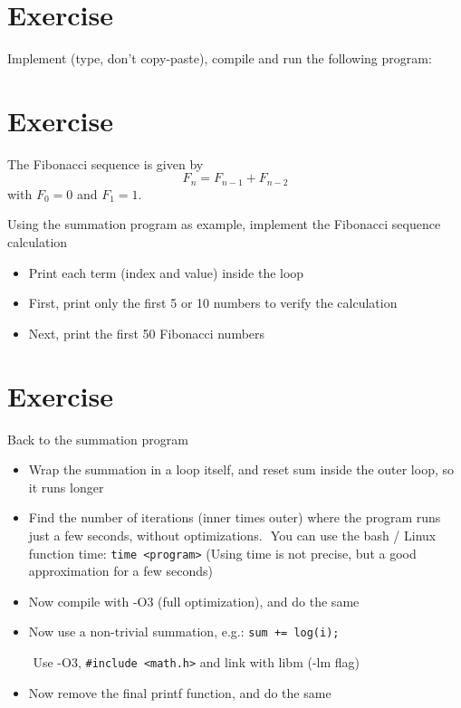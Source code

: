 \documentclass[a4paper]{article}
\begin{document}
\section{Exercise}

Implement (type, don't copy-paste), compile and run the following program:




\section{Exercise}

The Fibonacci sequence is given by
\begin{equation*}
F_n = F_{n-1} + F_{n-2}
\end{equation*}
with $F_0 = 0$ and $F_1 = 1$.

Using the summation program as example, implement the Fibonacci sequence calculation
\begin{itemize}
\item Print each term (index and value) inside the loop
\item First, print only the first 5 or 10 numbers to verify the calculation
\item Next, print the first 50 Fibonacci numbers
\end{itemize}

\section{Exercise}

Back to the summation program

\begin{itemize}
\item Wrap the summation in a loop itself, and reset sum inside the outer loop, so it runs longer

\item Find the number of iterations (inner times outer) where the program runs just a few seconds, without optimizations.  You can use the bash / Linux function time: \lstinline|time <program>| (Using time is not precise, but a good approximation for a few seconds)

\item Now compile with -O3 (full optimization), and do the same

\item Now use a non-trivial summation, e.g.: \lstinline|sum += log(i);|

   Use -O3, \lstinline|#include <math.h>| and link with libm (-lm flag)

\item  Now remove the final printf function, and do the same

\end{itemize}
\end{document}

